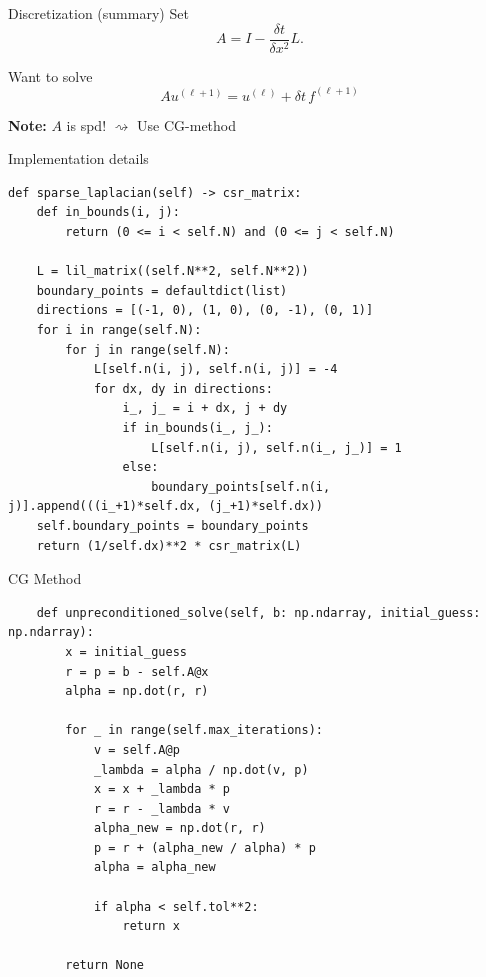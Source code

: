 \documentclass[11pt,aspectratio=1610]{beamer}
\begin{document}
\begin{frame}{Discretization (summary)}
    Set
    \begin{equation*}
        A = I - \frac{\delta t}{\delta x^2} L.
    \end{equation*}

    Want to solve
    \begin{equation*}
       Au^{(\ell+1)} = u^{(\ell)} + \delta t\, f^{(\ell+1)}
    \end{equation*}

   \textbf{Note:} $A$ is spd! $\rightsquigarrow$ Use CG-method
\end{frame}





\begin{frame}[fragile]{Implementation details}
\footnotesize
\begin{verbatim}
def sparse_laplacian(self) -> csr_matrix:
    def in_bounds(i, j): 
        return (0 <= i < self.N) and (0 <= j < self.N)
    
    L = lil_matrix((self.N**2, self.N**2)) 
    boundary_points = defaultdict(list) 
    directions = [(-1, 0), (1, 0), (0, -1), (0, 1)]
    for i in range(self.N):
        for j in range(self.N):
            L[self.n(i, j), self.n(i, j)] = -4 
            for dx, dy in directions:
                i_, j_ = i + dx, j + dy
                if in_bounds(i_, j_):
                    L[self.n(i, j), self.n(i_, j_)] = 1
                else:
                    boundary_points[self.n(i, j)].append(((i_+1)*self.dx, (j_+1)*self.dx)) 
    self.boundary_points = boundary_points
    return (1/self.dx)**2 * csr_matrix(L) 
\end{verbatim}
\end{frame}

\begin{frame}[fragile]{CG Method}
\footnotesize
\begin{verbatim}
    def unpreconditioned_solve(self, b: np.ndarray, initial_guess: np.ndarray):
    	x = initial_guess
        r = p = b - self.A@x 
        alpha = np.dot(r, r) 

        for _ in range(self.max_iterations):
            v = self.A@p 
            _lambda = alpha / np.dot(v, p)
            x = x + _lambda * p
            r = r - _lambda * v
            alpha_new = np.dot(r, r)
            p = r + (alpha_new / alpha) * p
            alpha = alpha_new

            if alpha < self.tol**2:
                return x
            
        return None
\end{verbatim}
\end{frame}
\end{document}
